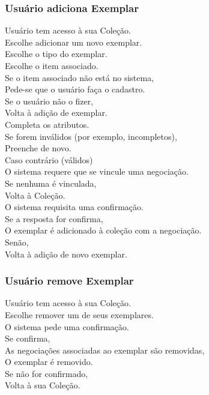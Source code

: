\subsubsection{Usuário adiciona Exemplar}
\begin{tabbing}
\pgs
\>\>Usuário tem acesso à sua Coleção.\\
\>\>Escolhe adicionar um novo exemplar.\\
\>\>Escolhe o tipo do exemplar.\\
\>\>Escolhe o item associado.\\
\>\>Se o item associado não está no sistema,\\
\>\>\>Pede-se que o usuário faça o cadastro.\\
\>\>\>Se o usuário não o fizer,\\
\>\>\>\>Volta à adição de exemplar.\\
\>\>Completa os atributos.\\
\>\>Se forem inválidos (por exemplo, incompletos),\\
\>\>\>Preenche de novo.\\
\>\>Caso contrário (válidos)\\
\>\>\>O sistema requere que se vincule uma negociação.\\
\>\>\>Se nenhuma é vinculada,\\
\>\>\>\>Volta à Coleção.\\
\>\>\>O sistema requisita uma confirmação.\\
\>\>\>Se a resposta for confirma,\\
\>\>\>\>O exemplar é adicionado à coleção com a negociação.\\
\>\>\>Senão,\\
\>\>\>\>Volta à adição de novo exemplar.
\end{tabbing}

\subsubsection{Usuário remove Exemplar}
\begin{tabbing}
\pgs
\>\>Usuário tem acesso à sua Coleção.\\
\>\>Escolhe remover um de seus exemplares.\\
\>\>O sistema pede uma confirmação.\\
\>\>Se confirma,\\
\>\>\>As negociações associadas ao exemplar são removidas,\\
\>\>\>O exemplar é removido.\\
\>\>Se não for confirmado,\\
\>\>\>Volta à sua Coleção.
\end{tabbing}

